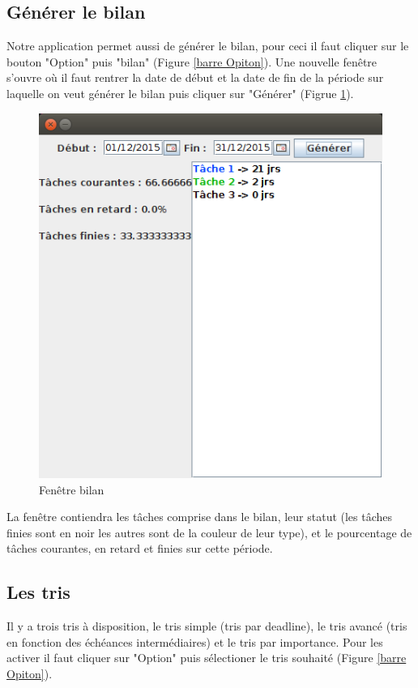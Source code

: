 \documentclass{article}
\begin{document}
\subsection{Générer le bilan}

Notre application permet aussi de générer le bilan, pour ceci il faut cliquer sur le bouton "Option" puis "bilan" (Figure \ref{barre Opiton}).
Une nouvelle fenêtre s'ouvre où il faut rentrer la date de début et la date de fin de la période sur laquelle on veut générer le bilan puis cliquer sur "Générer" (Figrue \ref{bilan}).

\begin{figure}
	\centering
	\includegraphics[scale=0.5]{images/CaptureDisplayBilan.png}
	\caption{Fenêtre bilan}
	\label{bilan}
\end{figure}

La fenêtre contiendra les tâches comprise dans le bilan, leur statut (les tâches finies sont en noir les autres sont de la couleur de leur type), et le pourcentage de tâches courantes, en retard et finies sur cette période.

\subsection{Les tris}

Il y a trois tris à disposition, le tris simple (tris par deadline), le tris avancé (tris en fonction des échéances intermédiaires) et le tris par importance. Pour les activer il faut cliquer sur "Option" puis sélectioner le tris souhaité (Figure \ref{barre Opiton}).
\end{document}
